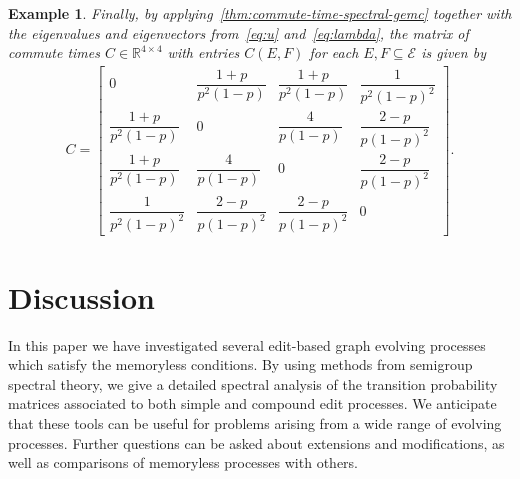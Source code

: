 \documentclass[11pt,a4paper]{article}
\newtheorem{example}[theorem]{Example}
\begin{document}
\begin{example}
    Finally, by applying~\cref{thm:commute-time-spectral-gemc} together with the eigenvalues and eigenvectors from~\cref{eq:u} and~\cref{eq:lambda}, the matrix of commute times $C\in\mathbb{R}^{4\times 4}$ with entries $C(E, F)$ for each $E, F\subseteq\mathcal{E}$ is given by
        {\begin{align*}
            C =
                \begin{bmatrix}
                0 & \dfrac{1+p}{p^{2}(1-p)} & \dfrac{1+p}{p^{2}(1-p)} & \dfrac{1}{p^{2}(1-p)^{2}}\\[8pt]
                \dfrac{1+p}{p^{2}(1-p)} & 0 & \dfrac{4}{p(1-p)} & \dfrac{2-p}{p(1-p)^{2}}\\[8pt]
                \dfrac{1+p}{p^{2}(1-p)} & \dfrac{4}{p(1-p)} & 0 & \dfrac{2-p}{p(1-p)^{2}}\\[8pt]
                \dfrac{1}{p^{2}(1-p)^{2}} & \dfrac{2-p}{p(1-p)^{2}} & \dfrac{2-p}{p(1-p)^{2}} & 0
                \end{bmatrix}.
        \end{align*}}
\end{example}

\section{Discussion}\label{sec:discussion}

In this paper we have investigated several edit-based graph evolving processes which satisfy the memoryless conditions. By using methods from semigroup spectral theory, we give a detailed spectral analysis of the transition probability matrices associated to both simple and compound edit processes. We anticipate that these tools can be useful for problems arising from a wide range of evolving processes. Further questions can be asked about extensions and modifications, as well as comparisons of memoryless processes with others. 
\end{document}
